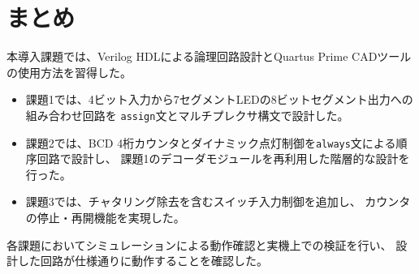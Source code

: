 \documentclass[a4paper,11pt]{ltjsarticle}
\begin{document}
\section{まとめ}

本導入課題では、Verilog HDLによる論理回路設計とQuartus Prime CADツールの使用方法を習得した。

\begin{itemize}
\item 課題1では、4ビット入力から7セグメントLEDの8ビットセグメント出力への組み合わせ回路を
  \texttt{assign}文とマルチプレクサ構文で設計した。
\item 課題2では、BCD 4桁カウンタとダイナミック点灯制御を\texttt{always}文による順序回路で設計し、
  課題1のデコーダモジュールを再利用した階層的な設計を行った。
\item 課題3では、チャタリング除去を含むスイッチ入力制御を追加し、
  カウンタの停止・再開機能を実現した。
\end{itemize}

各課題においてシミュレーションによる動作確認と実機上での検証を行い、
設計した回路が仕様通りに動作することを確認した。
\end{document}
